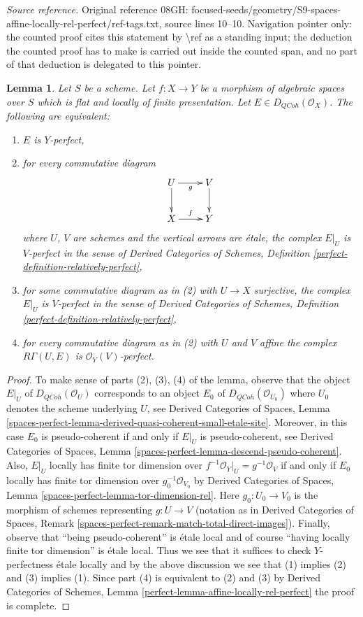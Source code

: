 \documentclass[10pt,a4paper]{amsart}
\theoremstyle{plain}
\newtheorem{lemma}[subsection]{Lemma}
\theoremstyle{definition}
\theoremstyle{remark}
\numberwithin{equation}{subsection}
\def\QCoh{\mathit{QCoh}}
\begin{document}
\noindent\textit{Source reference.} Original reference 08GH: focused-seeds/geometry/S9-spaces-affine-locally-rel-perfect/ref-tags.txt, source lines 10--10. Navigation pointer only: the counted proof cites this statement by \textbackslash{}ref as a standing input; the deduction the counted proof has to make is carried out inside the counted span, and no part of that deduction is delegated to this pointer.\par\medskip
\begin{lemma}
\label{lemma-affine-locally-rel-perfect}
Let $S$ be a scheme. Let $f : X \to Y$ be a morphism of algebraic spaces
over $S$ which is flat and locally of finite presentation.
Let $E \in D_\QCoh(\mathcal{O}_X)$. The following are equivalent:
\begin{enumerate}
\item $E$ is $Y$-perfect,
\item for every commutative diagram
$$
\xymatrix{
U \ar[d] \ar[r]_g & V \ar[d] \\
X \ar[r]^f & Y
}
$$
where $U$, $V$ are schemes and the vertical arrows are \'etale, the complex
$E|_U$ is $V$-perfect in the sense of Derived Categories of Schemes,
Definition \ref{perfect-definition-relatively-perfect},
\item for some commutative diagram as in (2) with $U \to X$
surjective, the complex $E|_U$ is $V$-perfect in the sense of
Derived Categories of Schemes,
Definition \ref{perfect-definition-relatively-perfect},
\item for every commutative diagram as in (2) with $U$ and $V$
affine the complex $R\Gamma(U, E)$ is $\mathcal{O}_Y(V)$-perfect.
\end{enumerate}
\end{lemma}

\begin{proof}
To make sense of parts (2), (3), (4) of the lemma, observe that
the object $E|_U$ of $D_\QCoh(\mathcal{O}_U)$ corresponds to
an object $E_0$ of $D_\QCoh(\mathcal{O}_{U_0})$ where $U_0$
denotes the scheme underlying $U$, see Derived Categories of Spaces,
Lemma \ref{spaces-perfect-lemma-derived-quasi-coherent-small-etale-site}.
Moreover, in this case $E_0$ is pseudo-coherent if and only if
$E|_U$ is pseudo-coherent, see Derived Categories of Spaces,
Lemma \ref{spaces-perfect-lemma-descend-pseudo-coherent}.
Also, $E|_U$ locally has finite tor dimension over
$f^{-1}\mathcal{O}_Y|_U = g^{-1}\mathcal{O}_V$ if and only if
$E_0$ locally has finite tor dimension over $g_0^{-1}\mathcal{O}_{V_0}$
by Derived Categories of Spaces, Lemma
\ref{spaces-perfect-lemma-tor-dimension-rel}.
Here $g_0 : U_0 \to V_0$ is the morphism of schemes representing
$g : U \to V$ (notation as in Derived Categories of Spaces,
Remark \ref{spaces-perfect-remark-match-total-direct-images}).
Finally, observe that ``being pseudo-coherent'' is \'etale local and
of course ``having locally finite tor dimension'' is \'etale local.
Thus we see that it suffices to check $Y$-perfectness \'etale locally
and by the above discussion we see that (1) implies (2) and
(3) implies (1). Since part (4) is equivalent
to (2) and (3) by
Derived Categories of Schemes, Lemma
\ref{perfect-lemma-affine-locally-rel-perfect}
the proof is complete.
\end{proof}
\end{document}
